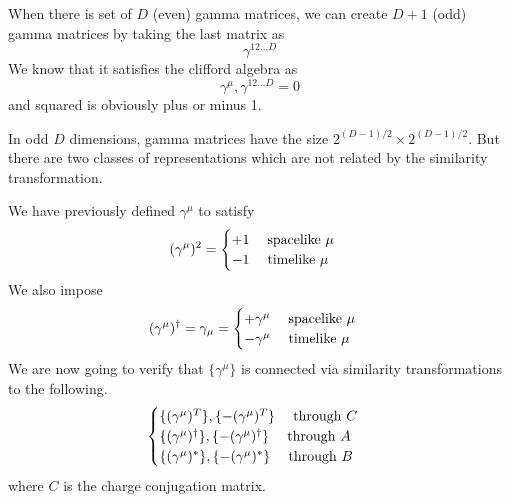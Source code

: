 \vspace{2ex}
\begin{thm}
When there is set of $D$ (even) gamma matrices, we can create $D+1$ (odd) gamma matrices by taking the last matrix as
\[\gamma ^{12\ldots D}\]
We know that it satisfies the clifford algebra as
\[\gamma ^{\mu },\gamma ^{12\ldots D}=0\]
and squared is obviously plus or minus 1.
\end{thm}
\vspace{2ex}
\begin{rmk}
In odd $D$ dimensions, gamma matrices have the size $2^{(D-1)/2}\times 2^{(D-1)/2}$. But there are two classes of representations which are not related by the similarity transformation. 
\end{rmk}
\vspace{2ex}
\begin{defi}
We have previously defined $\gamma ^{\mu }$ to satisfy
\[(\gamma^{\mu })^2=\begin{cases}
+1\hspace{3ex}\mathrm{spacelike\ }\mu \\
-1\hspace{3ex}\mathrm{timelike\ }\mu 
\end{cases}\]
We also impose
\[(\gamma ^{\mu })^{\dagger}=\gamma _{\mu }
=\begin{cases}
+\gamma ^{\mu }\hspace{3ex}\mathrm{spacelike\ }\mu \\
-\gamma ^{\mu }\hspace{3ex}\mathrm{timelike\ }\mu 
\end{cases}\]
We are now going to verify that $\{\gamma ^{\mu }\}$ is connected via similarity transformations to the following.
\[\begin{cases}
\{(\gamma ^{\mu })^{T}\},\{-(\gamma ^{\mu })^{T}\}\hspace{3ex}\mathrm{through\ }C\\
\{(\gamma ^{\mu })^{\dagger}\},\{-(\gamma ^{\mu })^{\dagger}\}\hspace{3ex}\mathrm{through\ }A\\
\{(\gamma ^{\mu })^{\ast}\},\{-(\gamma ^{\mu })^{\ast}\}\hspace{3ex}\mathrm{through\ }B
\end{cases}\]
where $C$ is the charge conjugation matrix.
\end{defi}
\vspace{2ex}
